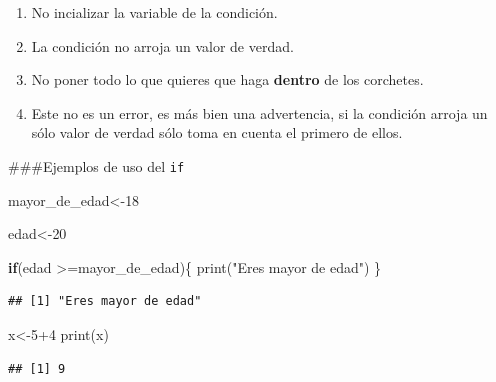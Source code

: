 \documentclass[
]{book}
\newenvironment{Shaded}{\begin{snugshade}}{\end{snugshade}}
\newcommand{\ControlFlowTok}[1]{\textcolor[rgb]{0.13,0.29,0.53}{\textbf{#1}}}
\newcommand{\DecValTok}[1]{\textcolor[rgb]{0.00,0.00,0.81}{#1}}
\newcommand{\FunctionTok}[1]{\textcolor[rgb]{0.00,0.00,0.00}{#1}}
\newcommand{\NormalTok}[1]{#1}
\newcommand{\OtherTok}[1]{\textcolor[rgb]{0.56,0.35,0.01}{#1}}
\newcommand{\SpecialCharTok}[1]{\textcolor[rgb]{0.00,0.00,0.00}{#1}}
\newcommand{\StringTok}[1]{\textcolor[rgb]{0.31,0.60,0.02}{#1}}
\providecommand{\tightlist}{%
  \setlength{\itemsep}{0pt}\setlength{\parskip}{0pt}}
\begin{document}
\begin{enumerate}
\def\labelenumi{\arabic{enumi}.}
\tightlist
\item
  No incializar la variable de la condición.
\item
  La condición no arroja un valor de verdad.
\item
  No poner todo lo que quieres que haga \textbf{dentro} de los corchetes.
\item
  Este no es un error, es más bien una advertencia, si la condición arroja un sólo valor de verdad sólo toma en cuenta el primero de ellos.
\end{enumerate}

\#\#\#Ejemplos de uso del \texttt{if}

\begin{Shaded}
\begin{Highlighting}[]
\NormalTok{mayor\_de\_edad}\OtherTok{\textless{}{-}}\DecValTok{18}

\NormalTok{edad}\OtherTok{\textless{}{-}}\DecValTok{20}

\ControlFlowTok{if}\NormalTok{(edad }\SpecialCharTok{\textgreater{}=}\NormalTok{mayor\_de\_edad)\{}
  \FunctionTok{print}\NormalTok{(}\StringTok{"Eres mayor de edad"}\NormalTok{)}
\NormalTok{\}}
\end{Highlighting}
\end{Shaded}

\begin{verbatim}
## [1] "Eres mayor de edad"
\end{verbatim}

\begin{Shaded}
\begin{Highlighting}[]
\NormalTok{x}\OtherTok{\textless{}{-}}\DecValTok{5}\SpecialCharTok{+}\DecValTok{4}
\FunctionTok{print}\NormalTok{(x)}
\end{Highlighting}
\end{Shaded}

\begin{verbatim}
## [1] 9
\end{verbatim}

\begin{Shaded}
\end{Shaded}
\end{document}
